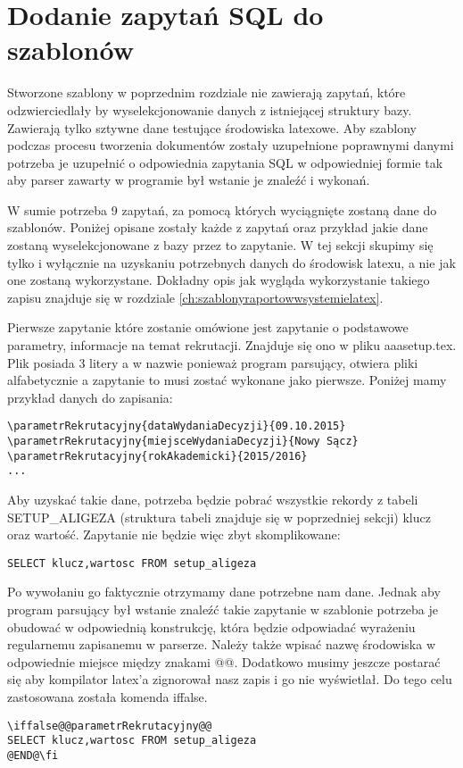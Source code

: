 \section{Dodanie zapytań SQL do szablonów}

Stworzone szablony w poprzednim rozdziale nie zawierają zapytań, które odzwierciedlały by wyselekcjonowanie danych z istniejącej struktury bazy. Zawierają tylko sztywne dane testujące środowiska latexowe. Aby szablony podczas procesu tworzenia dokumentów zostały uzupełnione poprawnymi danymi potrzeba je uzupełnić o odpowiednia zapytania SQL w odpowiedniej formie tak aby parser zawarty w programie był wstanie je znaleźć i wykonań.
\par 
W sumie potrzeba 9 zapytań, za pomocą których wyciągnięte zostaną dane do szablonów. Poniżej opisane zostały każde z zapytań oraz przykład jakie dane zostaną wyselekcjonowane z bazy przez to zapytanie. W tej sekcji skupimy się tylko i wyłącznie na uzyskaniu potrzebnych danych do środowisk latexu, a nie jak one zostaną wykorzystane. Dokładny opis jak wygląda wykorzystanie takiego zapisu znajduje się w rozdziale \ref{ch:szablonyraportowwsystemielatex}.
\par 
Pierwsze zapytanie które zostanie omówione jest  zapytanie o podstawowe parametry, informacje na temat rekrutacji. Znajduje się ono w pliku aaasetup.tex. Plik posiada 3 litery a w nazwie ponieważ program parsujący, otwiera pliki alfabetycznie a zapytanie to musi zostać wykonane jako pierwsze.  Poniżej mamy przykład danych do zapisania:
 \begin{verbatim}
\parametrRekrutacyjny{dataWydaniaDecyzji}{09.10.2015}
\parametrRekrutacyjny{miejsceWydaniaDecyzji}{Nowy Sącz}
\parametrRekrutacyjny{rokAkademicki}{2015/2016}
...
\end{verbatim}
Aby uzyskać takie dane, potrzeba będzie pobrać wszystkie rekordy z tabeli SETUP\_ALIGEZA (struktura tabeli znajduje się w poprzedniej sekcji) klucz oraz wartość. Zapytanie nie będzie więc zbyt skomplikowane:
 \begin{verbatim}
SELECT klucz,wartosc FROM setup_aligeza
\end{verbatim}
Po wywołaniu go faktycznie otrzymamy dane potrzebne nam dane. Jednak aby program parsujący był wstanie znaleźć takie zapytanie w szablonie potrzeba je obudować w odpowiednią konstrukcję, która będzie odpowiadać wyrażeniu regularnemu zapisanemu w parserze. Należy także wpisać nazwę środowiska w odpowiednie miejsce między znakami @@. Dodatkowo musimy jeszcze postarać się aby kompilator latex'a zignorował nasz zapis i go nie wyświetlał. Do tego celu zastosowana została komenda iffalse.
 \begin{verbatim}
\iffalse@@parametrRekrutacyjny@@
SELECT klucz,wartosc FROM setup_aligeza
@END@\fi
\end{verbatim}

